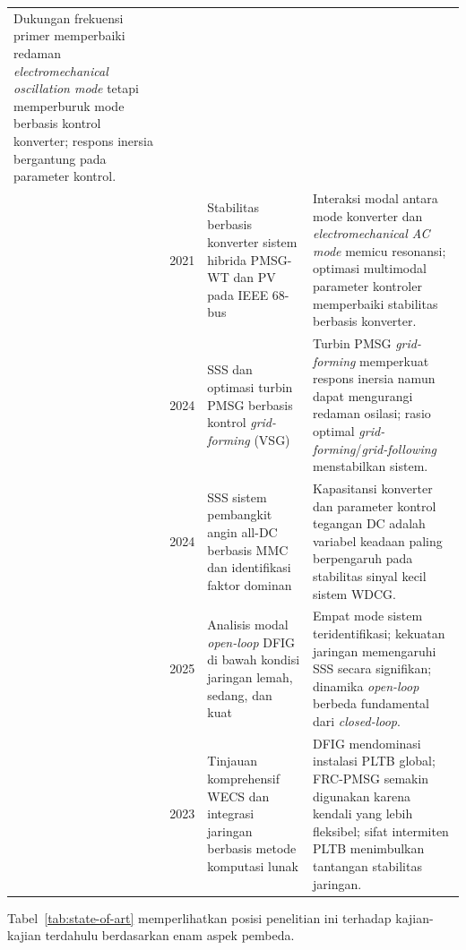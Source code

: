 \begin{longtable}{p{1.8cm} p{1.2cm} p{3.6cm} p{7.0cm}}
Dukungan frekuensi primer memperbaiki redaman \textit{electromechanical oscillation mode} tetapi memperburuk mode berbasis kontrol konverter; respons
inersia bergantung pada parameter kontrol. \\
\noalign{\vspace{4pt}}
\cite{luo2021converter} & 2021 &
Stabilitas berbasis konverter sistem hibrida PMSG-WT dan PV pada IEEE 68-bus &
Interaksi modal antara mode konverter dan \textit{electromechanical AC mode} memicu resonansi;
optimasi multimodal parameter kontroler memperbaiki stabilitas berbasis konverter. \\
\noalign{\vspace{4pt}}
\cite{li2024smallsignal} & 2024 &
SSS dan optimasi turbin PMSG berbasis kontrol \textit{grid-forming} (VSG) &
Turbin PMSG \textit{grid-forming} memperkuat respons inersia namun dapat mengurangi
redaman osilasi; rasio optimal \textit{grid-forming}/\textit{grid-following}
menstabilkan sistem. \\
\noalign{\vspace{4pt}}
\cite{jin2024analysis} & 2024 &
SSS sistem pembangkit angin all-DC berbasis MMC dan identifikasi faktor dominan &
Kapasitansi konverter dan parameter kontrol tegangan DC adalah variabel keadaan
paling berpengaruh pada stabilitas sinyal kecil sistem WDCG. \\
\noalign{\vspace{4pt}}
\cite{nirala2025impact} & 2025 &
Analisis modal \textit{open-loop} DFIG di bawah kondisi jaringan lemah, sedang,
dan kuat &
Empat mode sistem teridentifikasi; kekuatan jaringan memengaruhi SSS secara
signifikan; dinamika \textit{open-loop} berbeda fundamental dari
\textit{closed-loop}. \\
\noalign{\vspace{4pt}}

\cite{mostafa2023recent} & 2023 &
Tinjauan komprehensif WECS dan integrasi jaringan berbasis metode komputasi lunak &
DFIG mendominasi instalasi PLTB global; FRC-PMSG semakin digunakan karena kendali
yang lebih fleksibel; sifat intermiten PLTB menimbulkan tantangan stabilitas
jaringan. \\

\end{longtable}

Tabel~\ref{tab:state-of-art} memperlihatkan posisi penelitian ini terhadap
kajian-kajian terdahulu berdasarkan enam aspek pembeda.

